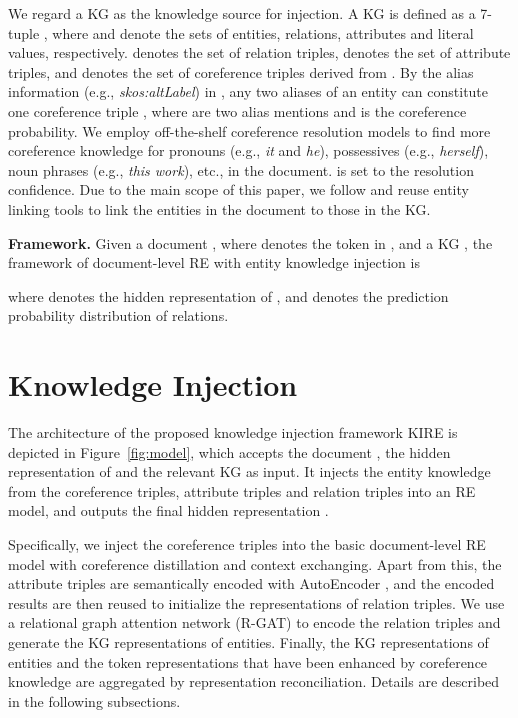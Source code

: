 \documentclass[runningheads]{llncs}
\begin{document}
We regard a KG as the knowledge source for injection.
A KG is defined as a 7-tuple  , where  and  denote the sets of entities, relations, attributes and literal values, respectively.  denotes the set of relation triples,  denotes the set of attribute triples, and  denotes the set of coreference triples derived from .
By the alias information (e.g., \textit{skos:altLabel}) in , any two aliases of an entity can constitute one coreference triple , where  are two alias mentions and  is the coreference probability.
We employ off-the-shelf coreference resolution models to find more coreference knowledge for pronouns (e.g., \textit{it} and \textit{he}), possessives (e.g., \textit{herself}), noun phrases (e.g., \textit{this work}), etc., in the document.
 is set to the resolution confidence.
Due to the main scope of this paper, we follow \cite{liu2020kbert,zhang2019ernie} and reuse entity linking tools to link the entities in the document to those in the KG. 

\textbf{Framework.}
Given a document , where  denotes the  token in , and a KG , the framework of document-level RE with entity knowledge injection is

where  denotes the hidden representation of , and  denotes the prediction probability distribution of relations. \hfill 


\section{Knowledge Injection}
\label{sect:model}

The architecture of the proposed knowledge injection framework KIRE is depicted in Figure~\ref{fig:model}, which accepts the document , the hidden representation  of  and the relevant KG  as input. 
It injects the entity knowledge from the coreference triples, attribute triples and relation triples into an RE model, and outputs the final hidden representation . 

Specifically, we inject the coreference triples into the basic document-level RE model with coreference distillation and context exchanging. 
Apart from this, the attribute triples are semantically encoded with AutoEncoder \cite{rumelhart1986learning}, and the encoded results are then reused to initialize the representations of relation triples.
We use a relational graph attention network (R-GAT) \cite{busbrige2019relational} to encode the relation triples and generate the KG representations of entities.
Finally, the KG representations of entities and the token representations that have been enhanced by coreference knowledge are aggregated by representation reconciliation. 
Details are described in the following subsections.
\end{document}
